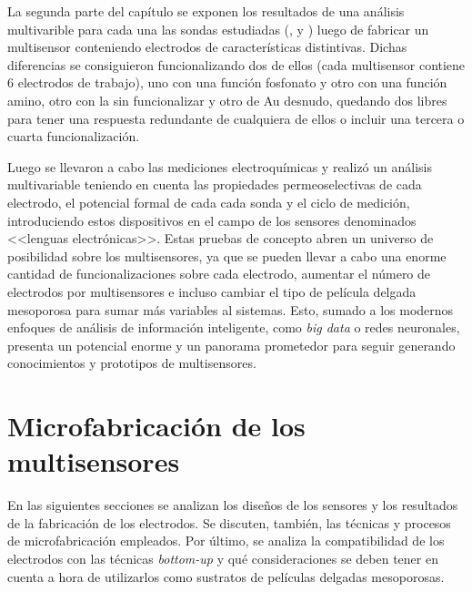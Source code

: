 	La segunda parte del capítulo se exponen los resultados de una análisis multivarible para cada una las sondas estudiadas (\ru, \fe\space y \fc) luego de fabricar un multisensor conteniendo electrodos de características distintivas. Dichas diferencias se consiguieron funcionalizando dos de ellos (cada multisensor contiene 6 electrodos de trabajo), uno con una función fosfonato y otro con una función amino, otro con la \pdm\space sin funcionalizar y otro de Au desnudo, quedando dos libres para tener una respuesta redundante de cualquiera de ellos o incluir una tercera o cuarta funcionalización.  

	Luego se llevaron a cabo las mediciones electroquímicas y realizó un análisis multivariable teniendo en cuenta las propiedades permeoselectivas de cada electrodo, el potencial formal de cada cada sonda y el ciclo de medición, introduciendo estos dispositivos en el campo de los sensores denominados <<lenguas electrónicas>>\cite{mimendia2010,tahara2013}. Estas pruebas de concepto abren un universo de posibilidad sobre los multisensores, ya que se pueden llevar a cabo una enorme cantidad de funcionalizaciones sobre cada electrodo\cite{Jeong2012,Angelome2008,Calvo20210,Herzog2013,walcariussss2001}, aumentar el número de electrodos por multisensores e incluso cambiar el tipo de película delgada mesoporosa para sumar más variables al sistemas. Esto, sumado a los modernos enfoques de análisis de información inteligente, como \textit{big data}\cite{bigdata2013} o redes neuronales\cite{redes2017}, presenta un potencial enorme y un panorama prometedor para seguir generando conocimientos y prototipos de multisensores.
	
\section{Microfabricación de los multisensores}\label{sec:microfabricaci_n_de_los_sensores}
		
	 	 En las siguientes secciones se analizan los diseños de los sensores y los resultados de la fabricación de los electrodos. Se discuten, también, las técnicas y procesos de microfabricación empleados. Por último, se analiza la compatibilidad de los electrodos con las técnicas \textit{bottom-up} y qué consideraciones se deben tener en cuenta a hora de utilizarlos como sustratos de películas delgadas mesoporosas.

